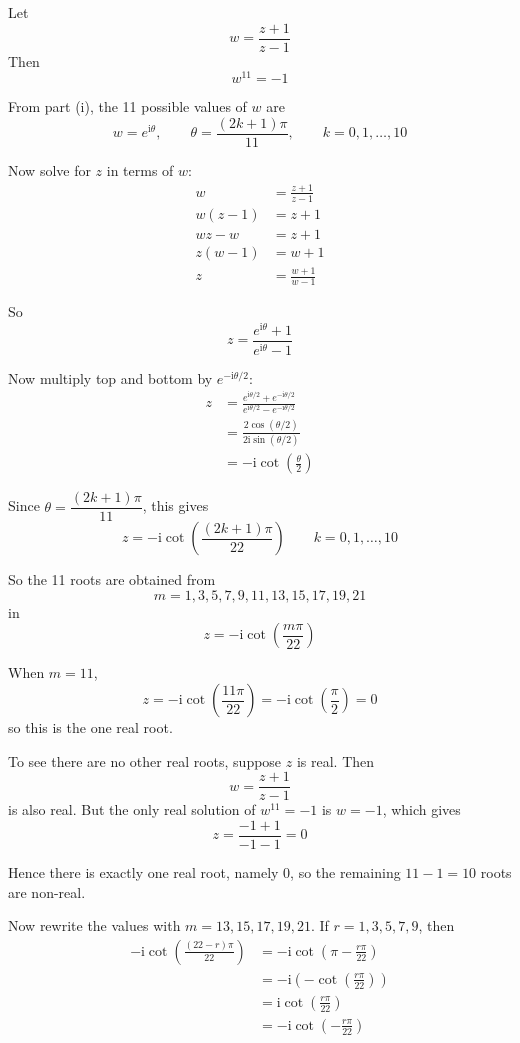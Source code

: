 \documentclass[leqno]{article}
\begin{document}
\begin{enumerate}[
  label=\textbf{\arabic*.},
  leftmargin=*,
  topsep=0pt,
  partopsep=0pt,
  parsep=0pt
]
\begin{tcolorbox}[colback=white, colframe=scarlet, title={\textbf{Solution}}, breakable, grow to left by=6mm, grow to right by=10mm]
\begin{enumerate}[label=\textbf{(\roman*)}]
Let
\[
w=\frac{z+1}{z-1}
\]
Then
\[
w^{11}=-1
\]

From part (i), the 11 possible values of $w$ are
\[
w=e^{\mathrm{i}\theta},
\qquad \theta=\frac{(2k+1)\pi}{11},
\qquad k=0,1,\dots,10
\]

Now solve for $z$ in terms of $w$:
\begin{align*}
w&=\frac{z+1}{z-1} \\
w(z-1)&=z+1 \\
wz-w&=z+1 \\
z(w-1)&=w+1 \\
z&=\frac{w+1}{w-1}
\end{align*}

So
\[
z=\frac{e^{\mathrm{i}\theta}+1}{e^{\mathrm{i}\theta}-1}
\]

Now multiply top and bottom by $e^{-\mathrm{i}\theta/2}$:
\begin{align*}
z&=\frac{e^{\mathrm{i}\theta/2}+e^{-\mathrm{i}\theta/2}}{e^{\mathrm{i}\theta/2}-e^{-\mathrm{i}\theta/2}} \\
&=\frac{2\cos(\theta/2)}{2\mathrm{i}\sin(\theta/2)} \\
&=-\mathrm{i}\cot\left(\frac{\theta}{2}\right)
\end{align*}

Since $\theta=\dfrac{(2k+1)\pi}{11}$, this gives
\[
z=-\mathrm{i}\cot\left(\frac{(2k+1)\pi}{22}\right)
\qquad k=0,1,\dots,10
\]

So the 11 roots are obtained from
\[
m=1,3,5,7,9,11,13,15,17,19,21
\]
in
\[
z=-\mathrm{i}\cot\left(\frac{m\pi}{22}\right)
\]

When $m=11$,
\[
z=-\mathrm{i}\cot\left(\frac{11\pi}{22}\right)
=-\mathrm{i}\cot\left(\frac{\pi}{2}\right)=0
\]
so this is the one real root.

To see there are no other real roots, suppose $z$ is real. Then
\[
w=\frac{z+1}{z-1}
\]
is also real. But the only real solution of $w^{11}=-1$ is $w=-1$, which gives
\[
z=\frac{-1+1}{-1-1}=0
\]

Hence there is exactly one real root, namely $0$, so the remaining $11-1=10$ roots are non-real.

Now rewrite the values with $m=13,15,17,19,21$. If $r=1,3,5,7,9$, then
\begin{align*}
-\mathrm{i}\cot\left(\frac{(22-r)\pi}{22}\right)
&=-\mathrm{i}\cot\left(\pi-\frac{r\pi}{22}\right) \\
&=-\mathrm{i}\left(-\cot\left(\frac{r\pi}{22}\right)\right) \\
&=\mathrm{i}\cot\left(\frac{r\pi}{22}\right) \\
&=-\mathrm{i}\cot\left(-\frac{r\pi}{22}\right)
\end{align*}


\end{enumerate}
\end{tcolorbox}
\end{enumerate}
\end{document}
